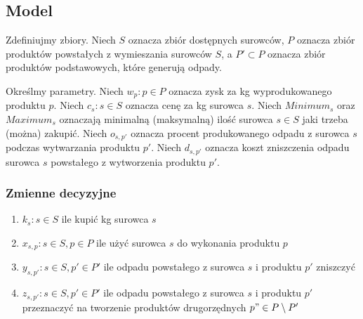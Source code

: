 \documentclass[a4paper,11pt]{article}
\theoremstyle{mytheor}
\begin{document}
\subsection*{Model}
Zdefiniujmy zbiory. Niech $S$ oznacza zbiór dostępnych surowców, $P$ oznacza zbiór produktów powstałych z wymieszania surowców $S$, a $P'\subset P$ oznacza zbiór produktów podstawowych, które generują odpady.

Określmy parametry.
Niech $w_p: p\in P$ oznacza zysk za kg wyprodukowanego produktu $p$.
Niech $c_s: s\in S$ oznacza cenę za kg surowca $s$.
Niech $\textit{Minimum}_s$ oraz $\textit{Maximum}_s$ oznaczają minimalną (maksymalną) ilość surowca $s\in S$ jaki trzeba (można) zakupić.
Niech $o_{s, p'}$ oznacza procent produkowanego odpadu z surowca $s$ podczas wytwarzania produktu $p'$.
Niech $d_{s, p'}$ oznacza koszt zniszczenia odpadu surowca $s$ powstałego z wytworzenia produktu $p'$.
\subsubsection*{Zmienne decyzyjne}
\begin{enumerate}
    \item $k_s: s\in S$ ile kupić kg surowca $s$
    \item $x_{s,p}: s\in S, p\in P$ ile użyć surowca $s$ do wykonania produktu $p$
    \item $y_{s,p'}: s\in S, p'\in P'$ ile odpadu powstałego z surowca $s$ i produktu $p'$ zniszczyć
    \item $z_{s,p'}: s\in S, p'\in P'$ ile odpadu powstałego z surowca $s$ i produktu $p'$ przeznaczyć na tworzenie produktów drugorzędnych $p"\in P\setminus P'$
\end{enumerate}
\end{document}
